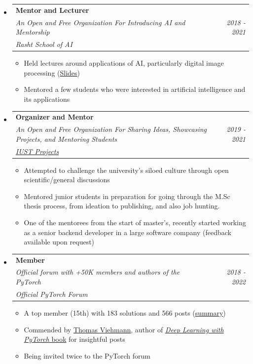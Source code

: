 \documentclass[letterpaper,11pt]{article}
\makeatletter
\newcommand{\resumeItem}[1]{
  \item\small{
    {#1 \vspace{0pt}}
  }
}
\newcommand{\resumeSubheading}[5]{
  \item
    \begin{tabular*}{0.97\textwidth}{l@{\extracolsep{\fill}}r}
      \textbf{#1} & #2 \\ 
      \textit{\small#3} & \textit{\small #4} \\
      \textit{#5} & 
    \end{tabular*}\vspace{-5pt}
}
\newcommand{\resumeSubHeadingListStart}{\begin{itemize}[leftmargin=*]}
\newcommand{\resumeSubHeadingListEnd}{\end{itemize}}
\newcommand{\resumeItemListStart}{\begin{itemize}}
\newcommand{\resumeItemListEnd}{\end{itemize}\vspace{-5pt}}
\makeatother
\begin{document}
  \resumeSubHeadingListStart
    \resumeSubheading
      {Mentor and Lecturer}{}
      {An Open and Free Organization For Introducing AI and Mentorship} 
      {2018 - 2021}{Rasht School of AI}
      \resumeItemListStart
        \resumeItem{Held lectures around applications of AI, particularly digital image processing (\href{https://github.com/rasht-school-of-ai/Meetup-Materials}{Slides})}
        \resumeItem{Mentored a few students who were interested in artificial intelligence and its applications}
      \resumeItemListEnd
  \resumeSubHeadingListEnd

  \resumeSubHeadingListStart
    \resumeSubheading
      {Organizer and Mentor}{}
      {An Open and Free Organization For Sharing Ideas, Showcasing Projects, and Mentoring Students} 
      {2019 - 2021}{\href{http://iust-projects.ir/}{IUST Projects}}
      \resumeItemListStart
        \resumeItem{Attempted to challenge the university's siloed culture through open scientific/general discussions}
        \resumeItem{Mentored junior students in preparation for going through the M.Sc thesis process, from ideation to publishing, and also job hunting.}
        \resumeItem{One of the mentorees from the start of master's, recently started working as a senior backend developer in a large software company (feedback available upon request)}
      \resumeItemListEnd
  \resumeSubHeadingListEnd

  \resumeSubHeadingListStart
    \resumeSubheading
      {Member}{}
      {Official forum with +50K members and authors of the PyTorch} 
      {2018 - 2022}{{Official PyTorch Forum}}
      \resumeItemListStart
        \resumeItem{A top member (15th) with 183 solutions and 566 posts (\href{https://discuss.pytorch.org/u/Nikronic/}{summary})}
        \resumeItem{Commended by \href{https://x.com/ThomasViehmann/status/1309794697049714689}{Thomas Viehmann}, author of \href{https://www.manning.com/books/deep-learning-with-pytorch}{\emph{Deep Learning with PyTorch} book} for insightful posts}
        \resumeItem{Being invited twice to the PyTorch forum}
      \resumeItemListEnd
  \resumeSubHeadingListEnd
\end{document}
